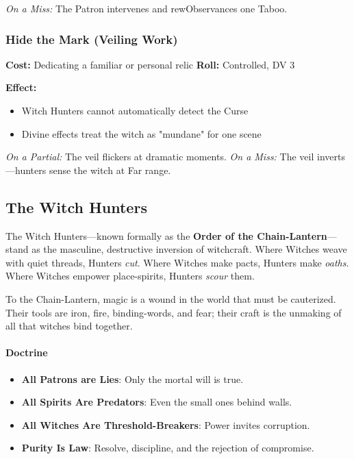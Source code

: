 \documentclass[11pt]{book}
\begin{document}
\begin{tcolorbox}[colback=shadowpurple!5,colframe=shadowpurple!80!black,
title={\textbf{Coven Workings and the Curse of the Unanointed}}]
\emph{On a Miss:}  
The Patron intervenes and rewObservances one Taboo.

\vspace{1em}

\subsubsection*{Hide the Mark (Veiling Work)}
\textbf{Cost:} Dedicating a familiar or personal relic  
\textbf{Roll:} Controlled, DV 3

\textbf{Effect:}
\begin{itemize}[leftmargin=1.5em]
    \item Witch Hunters cannot automatically detect the Curse
    \item Divine effects treat the witch as "mundane" for one scene
\end{itemize}

\emph{On a Partial:} The veil flickers at dramatic moments.  
\emph{On a Miss:} The veil inverts---hunters sense the witch at Far range.

\end{tcolorbox}

\subsection{The Witch Hunters}

The Witch Hunters---known formally as the \textbf{Order of the Chain-Lantern}---stand as the masculine, destructive inversion of witchcraft.  
Where Witches weave with quiet threads, Hunters \emph{cut}.  
Where Witches make pacts, Hunters make \emph{oaths}.  
Where Witches empower place-spirits, Hunters \emph{scour} them.

To the Chain-Lantern, magic is a wound in the world that must be cauterized.  
Their tools are iron, fire, binding-words, and fear; their craft is the unmaking of all that witches bind together.

\paragraph{Doctrine}
\begin{itemize}
    \item \textbf{All Patrons are Lies}: Only the mortal will is true.
    \item \textbf{All Spirits Are Predators}: Even the small ones behind walls.
    \item \textbf{All Witches Are Threshold-Breakers}: Power invites corruption.
    \item \textbf{Purity Is Law}: Resolve, discipline, and the rejection of compromise.
\end{itemize}
\end{document}
